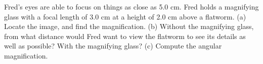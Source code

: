 Fred's eyes are able to focus on things as close as 5.0
cm. Fred holds a magnifying glass with a focal length of 3.0
cm at a height of 2.0 cm above a flatworm. (a) Locate the
image, and find the magnification. (b) Without the
magnifying glass, from what distance would Fred want to view
the flatworm to see its details as well as possible? With
the magnifying glass? (c) Compute the angular magnification.

